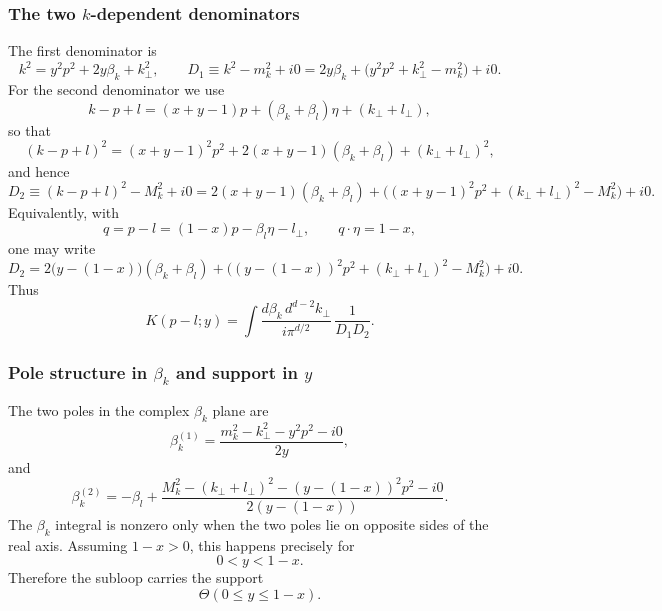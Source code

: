 \documentclass[11pt]{article}
\begin{document}
\subsubsection{The two $k$-dependent denominators}

The first denominator is
\begin{equation}
k^2=y^2p^2+2y\beta_k+k_\perp^2,
\qquad
D_1\equiv k^2-m_k^2+i0=2y\beta_k+\bigl(y^2p^2+k_\perp^2-m_k^2\bigr)+i0.
\label{eq:D1}
\end{equation}
For the second denominator we use
\[
k-p+l=(x+y-1)p+(\beta_k+\beta_l)\eta+(k_\perp+l_\perp),
\]
so that
\begin{equation}
(k-p+l)^2=(x+y-1)^2p^2+2(x+y-1)(\beta_k+\beta_l)+(k_\perp+l_\perp)^2,
\label{eq:kplsq}
\end{equation}
and hence
\begin{equation}
D_2\equiv (k-p+l)^2-M_k^2+i0
=2(x+y-1)(\beta_k+\beta_l)+\bigl((x+y-1)^2p^2+(k_\perp+l_\perp)^2-M_k^2\bigr)+i0.
\label{eq:D2}
\end{equation}
Equivalently, with
\[
q=p-l=(1-x)p-\beta_l\eta-l_\perp,
\qquad q\cdot\eta=1-x,
\]
one may write
\begin{equation}
D_2
=2\bigl(y-(1-x)\bigr)(\beta_k+\beta_l)
+\bigl((y-(1-x))^2p^2+(k_\perp+l_\perp)^2-M_k^2\bigr)+i0.
\label{eq:D2-alt}
\end{equation}
Thus
\begin{equation}
K(p-l;y)=
\int \frac{d\beta_k\,d^{d-2}k_\perp}{i\pi^{d/2}}\,
\frac{1}{D_1D_2}.
\label{eq:Kbetak}
\end{equation}

\subsubsection{Pole structure in $\beta_k$ and support in $y$}

The two poles in the complex $\beta_k$ plane are
\begin{equation}
\beta_k^{(1)}=
\frac{m_k^2-k_\perp^2-y^2p^2-i0}{2y},
\label{eq:beta1}
\end{equation}
and
\begin{equation}
\beta_k^{(2)}=
-\beta_l+
\frac{M_k^2-(k_\perp+l_\perp)^2-(y-(1-x))^2p^2-i0}{2(y-(1-x))}.
\label{eq:beta2}
\end{equation}
The $\beta_k$ integral is nonzero only when the two poles lie on opposite sides of the real axis. Assuming $1-x>0$, this happens precisely for
\begin{equation}
0<y<1-x.
\label{eq:support-y}
\end{equation}
Therefore the subloop carries the support
\begin{equation}
\Theta(0\le y\le 1-x).
\label{eq:support-theta}
\end{equation}
\end{document}
